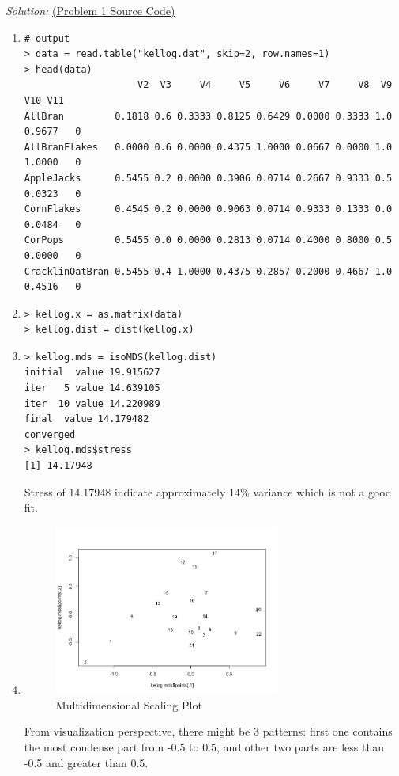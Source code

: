 \documentclass{article}
\newenvironment{solution}
    {\textit{Solution:}}
    {}
\begin{document}
\begin{solution}
\href{run:./src/p1.r}{ (Problem 1 Source Code)}
\begin{enumerate}
\item\mbox{}
	\begin{lstlisting}
# output
> data = read.table("kellog.dat", skip=2, row.names=1)
> head(data)
                    V2  V3     V4     V5     V6     V7     V8  V9    V10 V11
AllBran         0.1818 0.6 0.3333 0.8125 0.6429 0.0000 0.3333 1.0 0.9677   0
AllBranFlakes   0.0000 0.6 0.0000 0.4375 1.0000 0.0667 0.0000 1.0 1.0000   0
AppleJacks      0.5455 0.2 0.0000 0.3906 0.0714 0.2667 0.9333 0.5 0.0323   0
CornFlakes      0.4545 0.2 0.0000 0.9063 0.0714 0.9333 0.1333 0.0 0.0484   0
CorPops         0.5455 0.0 0.0000 0.2813 0.0714 0.4000 0.8000 0.5 0.0000   0
CracklinOatBran 0.5455 0.4 1.0000 0.4375 0.2857 0.2000 0.4667 1.0 0.4516   0
	\end{lstlisting}
\newpage
\item\mbox{}
	\begin{lstlisting}
> kellog.x = as.matrix(data)
> kellog.dist = dist(kellog.x)
	\end{lstlisting}
\item\mbox{}
	\begin{lstlisting}
> kellog.mds = isoMDS(kellog.dist)
initial  value 19.915627 
iter   5 value 14.639105
iter  10 value 14.220989
final  value 14.179482 
converged
> kellog.mds$stress
[1] 14.17948
	\end{lstlisting}	
Stress of 14.17948 indicate approximately 14\% variance which is not a good fit.
\item\mbox{}
	\begin{figure}[h]
		\centering
		\includegraphics[width=0.7\textwidth]{Figure1_Rplot.jpeg}
		\caption{Multidimensional Scaling Plot}
	\end{figure}
From visualization perspective, there might be 3 patterns: first one contains the most condense part from -0.5 to 0.5, and other two parts are less than -0.5 and greater than 0.5.

\end{enumerate}
\end{solution}
\end{document}
